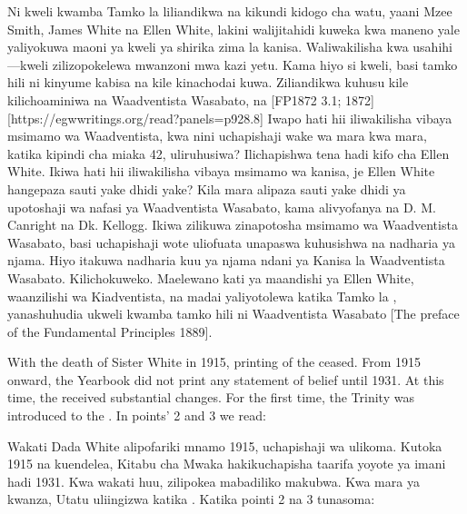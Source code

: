 Ni kweli kwamba Tamko la  liliandikwa na kikundi kidogo cha watu, yaani Mzee Smith, James White na Ellen White, lakini walijitahidi kuweka kwa maneno yale yaliyokuwa maoni ya kweli ya shirika zima la kanisa. Waliwakilisha kwa usahihi —kweli zilizopokelewa mwanzoni mwa kazi yetu. Kama hiyo si kweli, basi tamko hili ni kinyume kabisa na kile kinachodai kuwa. Ziliandikwa  kuhusu kile kilichoaminiwa na Waadventista Wasabato,  na [FP1872 3.1; 1872][https://egwwritings.org/read?panels=p928.8] Iwapo hati hii iliwakilisha vibaya msimamo wa Waadventista, kwa nini uchapishaji wake wa mara kwa mara, katika kipindi cha miaka 42, uliruhusiwa? Ilichapishwa tena hadi kifo cha Ellen White. Ikiwa hati hii iliwakilisha vibaya msimamo wa kanisa, je Ellen White hangepaza sauti yake dhidi yake? Kila mara alipaza sauti yake dhidi ya upotoshaji wa nafasi ya Waadventista Wasabato, kama alivyofanya na D. M. Canright na Dk. Kellogg. Ikiwa  zilikuwa zinapotosha msimamo wa Waadventista Wasabato, basi uchapishaji wote uliofuata unapaswa kuhusishwa na nadharia ya njama. Hiyo itakuwa nadharia kuu ya njama ndani ya Kanisa la Waadventista Wasabato. Kilichokuweko. Maelewano kati ya maandishi ya Ellen White, waanzilishi wa Kiadventista, na madai yaliyotolewa katika Tamko la , yanashuhudia ukweli kwamba tamko hili ni  Waadventista Wasabato [The preface of the Fundamental Principles 1889].


With the death of Sister White in 1915, printing of the  ceased. From 1915 onward, the Yearbook did not print any statement of belief until 1931. At this time, the  received substantial changes. For the first time, the Trinity was introduced to the . In points’ 2 and 3 we read:


Wakati Dada White alipofariki mnamo 1915, uchapishaji wa  ulikoma. Kutoka 1915 na kuendelea, Kitabu cha Mwaka hakikuchapisha taarifa yoyote ya imani hadi 1931. Kwa wakati huu,  zilipokea mabadiliko makubwa. Kwa mara ya kwanza, Utatu uliingizwa katika . Katika pointi 2 na 3 tunasoma:




